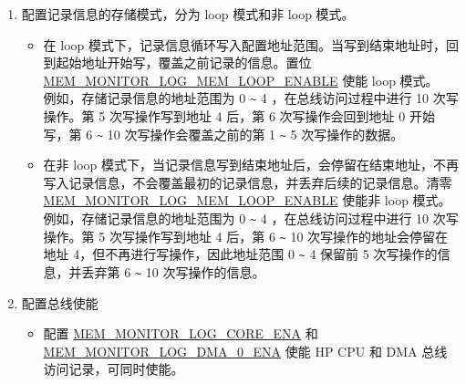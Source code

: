 \documentclass[main\_\_CN.tex]{subfiles}
\begin{document}
\begin{enumerate}
\begin{itemize}
            \item 置位 \hyperref[regdesc:MEMMONITORLOGMEMADDRUPDATEREG]{MEM\_MONITOR\_LOG\_MEM\_ADDR\_UPDATE\_REG}，使 \hyperref[regdesc:MEMMONITORLOGMEMCURRENTADDRREG]{MEM\_MONITOR\_LOG\_MEM\_CURRENT\_ADDR\_REG} 更新为 \hyperref[regdesc:MEMMONITORLOGMEMSTARTREG]{MEM\_MONITOR\_LOG\_MEM\_START\_REG}。
            \item 配置辅助调试模块对 HP SRAM 的使用权限。只有开启辅助调试模块对 HP SRAM 的使用权限，才能访问 HP SRAM。关于如何配置，详情见章节 \ref{mod:permctrl} \textit{}。
        \end{itemize}
    \item \label{other:dbgassist-item-log-config-step5} 配置记录信息的存储模式，分为 loop 模式和非 loop 模式。
        \begin{itemize}
            \item 在 loop 模式下，记录信息循环写入配置地址范围。当写到结束地址时，回到起始地址开始写，覆盖之前记录的信息。置位 \hyperref[fielddesc:MEMMONITORLOGMEMLOOPENABLE]{MEM\_MONITOR\_LOG\_MEM\_LOOP\_ENABLE} 使能 loop 模式。\\
            例如，存储记录信息的地址范围为 0 \verb+~+ 4 ，在总线访问过程中进行 10 次写操作。第 5 次写操作写到地址 4 后，第 6 次写操作会回到地址 0 开始写，第 6 \verb+~+ 10 次写操作会覆盖之前的第 1 \verb+~+ 5 次写操作的数据。
            \item 在非 loop 模式下，当记录信息写到结束地址后，会停留在结束地址，不再写入记录信息，不会覆盖最初的记录信息，并丢弃后续的记录信息。清零 \hyperref[fielddesc:MEMMONITORLOGMEMLOOPENABLE]{MEM\_MONITOR\_LOG\_MEM\_LOOP\_ENABLE} 使能非 loop 模式。\\
            例如，存储记录信息的地址范围为 0 \verb+~+ 4 ，在总线访问过程中进行 10 次写操作。第 5 次写操作写到地址 4 后，第 6 \verb+~+ 10 次写操作的地址会停留在地址 4，但不再进行写操作，因此地址范围 0 \verb+~+ 4 保留前 5 次写操作的信息，并丢弃第 6 \verb+~+ 10 次写操作的信息。
        \end{itemize}
    \item 配置总线使能
    \begin{itemize}
        \item 配置 \hyperref[fielddesc:MEMMONITORLOGCOREENA]{MEM\_MONITOR\_LOG\_CORE\_ENA} 和 \hyperref[fielddesc:MEMMONITORLOGDMA0ENA]{MEM\_MONITOR\_LOG\_DMA\_0\_ENA} 使能 HP CPU 和 DMA 总线访问记录，可同时使能。
    \end{itemize}
\end{enumerate}
    
\end{document}
